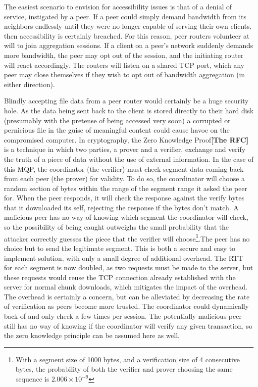 \documentclass[12pt]{article}
\newcommand{\lcite}[1]
{{\bfseries\color{orange}[#1]}}
\begin{document}
		The easiest scenario to envision for accessibility issues is that of a denial of service, instigated by a peer. If a peer could simply demand bandwidth from its neighbors endlessly until they were no longer capable of serving their own clients, then accessibility is certainly breached. For this reason, peer routers volunteer at will to join aggregation sessions. If a client on a peer's network suddenly demands more bandwidth, the peer may opt out of the session, and the initiating router will react accordingly. The routers will listen on a shared TCP port, which any peer may close themselves if they wish to opt out of bandwidth aggregation (in either direction).

		Blindly accepting file data from a peer router would certainly be a huge security hole. As the data being sent back to the client is stored directly to their hard disk (presumably with the pretense of being accessed very soon) a corrupted or pernicious file in the guise of meaningful content could cause havoc on the compromised computer. In cryptography, the Zero Knowledge Proof\lcite{The RFC} is a technique in which two parties, a prover and a verifier, exchange and verify the truth of a piece of data without the use of external information. In the case of this MQP, the coordinator (the verifier) must check segment data coming back from each peer (the prover) for validity. To do so, the coordinator will choose a random section of bytes within the range of the segment range it asked the peer for. When the peer responds, it will check the response against the verify bytes that it downloaded its self, rejecting the response if the bytes don't match. A malicious peer has no way of knowing which segment the coordinator will check, so the possibility of being caught outweighs the small probability that the attacker correctly guesses the piece that the verifier will choose\footnote{With a segment size of 1000 bytes, and a verification size of 4 consecutive bytes, the probability of both the verifier and prover choosing the same sequence is $2.006\times10^{-9}$}.The peer has no choice but to send the legitimate segment. This is both a secure and easy to implement solution, with only a small degree of additional overhead. The RTT for each segment is now doubled, as two requests must be made to the server, but these requests would reuse the TCP connection already established with the server for normal chunk downloads, which mitigates the impact of the overhead. The overhead is certainly a concern, but can be alleviated by decreasing the rate of verification as peers become more trusted. The coordinator could dynamically back of and only check a few times per session. The potentially malicious peer still has no way of knowing if the coordinator will verify any given transaction, so the zero knowledge principle can be assumed here as well. 
\end{document}
